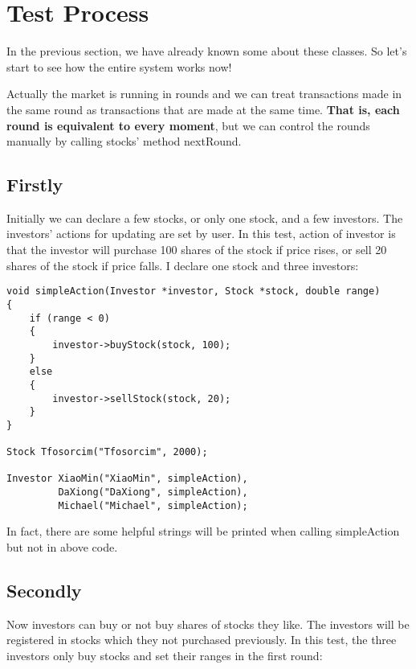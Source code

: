 \documentclass{article}
\begin{document}
\section{Test Process}

    In the previous section, we have already known some about these classes. So let's start to see how the entire system works now!

    Actually the market is running in rounds and we can treat transactions made in the same round as transactions that are made at the same time. \textbf{That is, each round is equivalent to every moment}, but we can control the rounds manually by calling stocks' method nextRound.

\subsection{Firstly}

    Initially we can declare a few stocks, or only one stock, and a few investors. The investors' actions for updating are set by user. In this test, action of investor is that the investor will purchase 100 shares of the stock if price rises, or sell 20 shares of the stock if price falls. I declare one stock and three investors:

\begin{lstlisting}
void simpleAction(Investor *investor, Stock *stock, double range)
{
    if (range < 0)
    {
        investor->buyStock(stock, 100);
    }
    else
    {
        investor->sellStock(stock, 20);
    }
}

Stock Tfosorcim("Tfosorcim", 2000);

Investor XiaoMin("XiaoMin", simpleAction),
         DaXiong("DaXiong", simpleAction),
         Michael("Michael", simpleAction);

\end{lstlisting}

    In fact, there are some helpful strings will be printed when calling simpleAction but not in above code.

\subsection{Secondly}

    Now investors can buy or not buy shares of stocks they like. The investors will be registered in stocks which they not purchased previously. In this test, the three investors only buy stocks and set their ranges in the first round:
\end{document}
